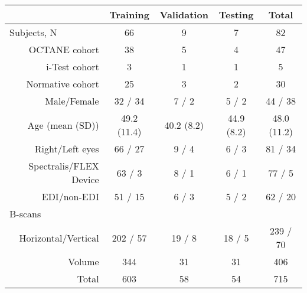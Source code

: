 \begin{tabular}{@{}lccc|c@{}}
\toprule
\hspace{4em}                    & \hspace{1em}Training\hspace{1.3em}       & \hspace{1em}Validation\hspace{1.3em}     &\hspace{1em}Testing\hspace{1.3em}  & Total        \\ \midrule
\multicolumn{1}{l}{Subjects, N} & 66 & 9 & 7 & 82\\
\multicolumn{1}{r}{OCTANE cohort} & 38 & 5 & 4 & 47 \\
\multicolumn{1}{r}{i-Test cohort} & 3 & 1 & 1 & 5 \\
\multicolumn{1}{r}{Normative cohort} & 25 & 3 & 2 & 30 \\
\multicolumn{1}{r}{Male/Female} & 32 / 34 & 7 / 2 & 5 / 2& 44 / 38     \\
\multicolumn{1}{r}{Age (mean (SD))}   & 49.2 (11.4) & 40.2 (8.2) & 44.9 (8.2) & 48.0 (11.2) \\
\multicolumn{1}{r}{Right/Left eyes}     & 66 / 27       & 9 / 4      & 6 / 3    & 81 / 34      \\
\multicolumn{1}{r}{Spectralis/FLEX Device} & 63 / 3 & 8 / 1 & 6 / 1 & 77 / 5 \\
\multicolumn{1}{r}{EDI/non-EDI} & 51 / 15 & 6 / 3 & 5 / 2 & 62 / 20 \\
B-scans & & & & \\
\multicolumn{1}{r}{Horizontal/Vertical} & 202 / 57      & 19 / 8    & 18 / 5    & 239 / 70     \\
\multicolumn{1}{r}{Volume}           & 344          & 31        & 31         & 406          \\
\multicolumn{1}{r}{Total}         & 603          & 58        & 54        & 715          \\ 
\bottomrule
\end{tabular}%
